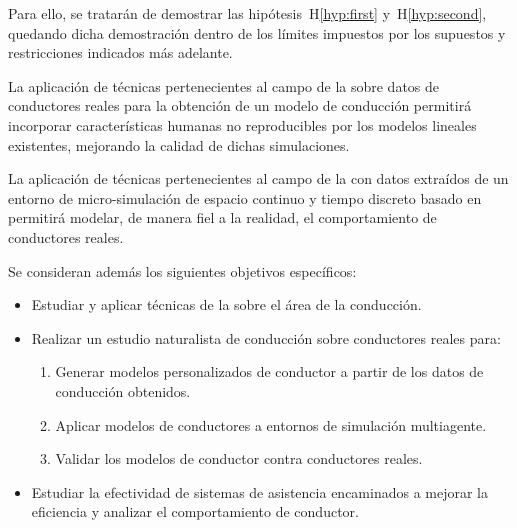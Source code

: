 Para ello, se tratarán de demostrar las hipótesis~H\ref{hyp:first} y~H\ref{hyp:second}, quedando dicha demostración dentro de los límites impuestos por los supuestos y restricciones indicados más adelante.

\begin{hyp} \label{hyp:first}
	La aplicación de técnicas pertenecientes al campo de la  sobre datos de conductores reales para la obtención de un modelo de conducción permitirá incorporar características humanas no reproducibles por los modelos lineales existentes, mejorando la calidad de dichas simulaciones.
\end{hyp}

\begin{hyp} \label{hyp:second}
	La aplicación de técnicas pertenecientes al campo de la  con datos extraídos de un entorno de micro-simulación de espacio continuo y tiempo discreto basado en  permitirá modelar, de manera fiel a la realidad, el comportamiento de conductores reales.
\end{hyp}

Se consideran además los siguientes objetivos específicos:

\begin{itemize}
	\item Estudiar y aplicar técnicas de la  sobre el área de la conducción.
	\item Realizar un estudio naturalista de conducción sobre conductores reales para:
	\begin{enumerate}
		\item Generar modelos personalizados de conductor a partir de los datos de conducción obtenidos.
		\item Aplicar modelos de conductores a entornos de simulación multiagente.
		\item Validar los modelos de conductor contra conductores reales.
	\end{enumerate}
	\item Estudiar la efectividad de sistemas de asistencia encaminados a mejorar la eficiencia y analizar el comportamiento de conductor.
\end{itemize}

